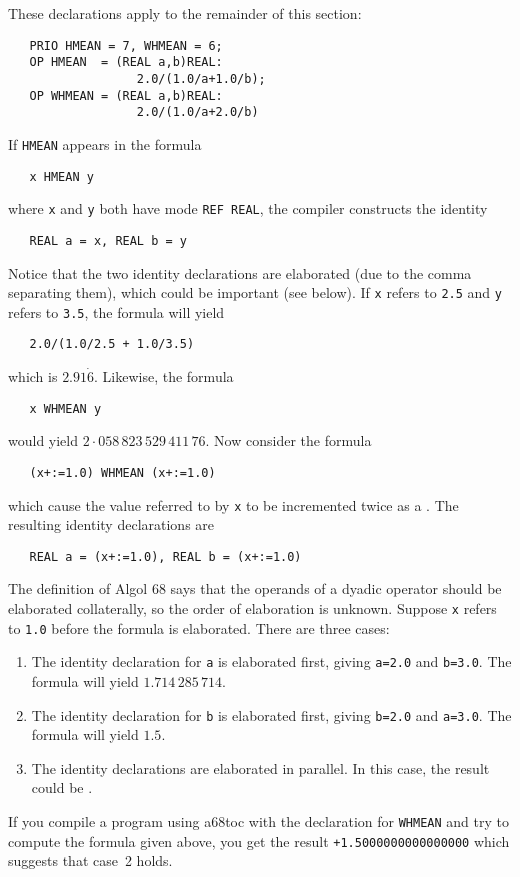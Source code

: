 These declarations apply to the remainder of this section:
\begin{verbatim}
   PRIO HMEAN = 7, WHMEAN = 6;
   OP HMEAN  = (REAL a,b)REAL:
                  2.0/(1.0/a+1.0/b);
   OP WHMEAN = (REAL a,b)REAL:
                  2.0/(1.0/a+2.0/b)
\end{verbatim}
\noindent
If \verb|HMEAN| appears in the formula
\begin{verbatim}
   x HMEAN y
\end{verbatim}
\noindent
where \verb|x| and \verb|y| both have mode \verb|REF REAL|, the
compiler constructs the identity
\begin{verbatim}
   REAL a = x, REAL b = y
\end{verbatim}
\noindent
Notice that the two identity declarations are elaborated
 (due to the comma
separating them), which could be important (see below).  If \verb|x|
refers to \verb|2.5| and \verb|y| refers to \verb|3.5|, the formula
will yield
\begin{verbatim}
   2.0/(1.0/2.5 + 1.0/3.5)
\end{verbatim}
\noindent
which is $2.91\dot6$. Likewise, the formula
\begin{verbatim}
   x WHMEAN y
\end{verbatim}
\noindent
would yield $2\cdot058\,823\,529\,411\,76$. Now consider the formula
\begin{verbatim}
   (x+:=1.0) WHMEAN (x+:=1.0)
\end{verbatim}
\noindent
which cause the value referred to by \verb|x| to be incremented twice
as a . The resulting identity declarations are
\begin{verbatim}
   REAL a = (x+:=1.0), REAL b = (x+:=1.0)
\end{verbatim}
\noindent
The definition of Algol 68 says that the operands of a dyadic operator
should be elaborated collaterally, so the order of elaboration is
unknown. Suppose \verb|x| refers to \verb|1.0| before the formula is
elaborated. There are three cases:
\begin{enumerate}
\item The identity declaration for \verb|a| is elaborated first,
giving \verb|a=2.0| and \verb|b=3.0|. The formula will yield
$1.714\,285\,714$.
\item The identity declaration for \verb|b| is elaborated first,
giving \verb|b=2.0| and \verb|a=3.0|. The formula will yield $1.5$.
\item The identity declarations are elaborated in parallel. In this
case, the result could be .
\end{enumerate}
If you compile a program using a68toc with the declaration for
\verb|WHMEAN| and try to compute the formula given above, you get the
result \verb|+1.5000000000000000| which suggests that case~2
holds.

